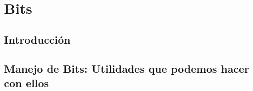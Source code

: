 \documentclass[12pt, fleqn]{report}                             %
\theoremstyle{break}                                            %
\begin{document}
        \clearpage
        \section{Bits}

            \subsection{Introducción}


            \subsection{Manejo de Bits: Utilidades que podemos hacer con ellos}
\end{document}
